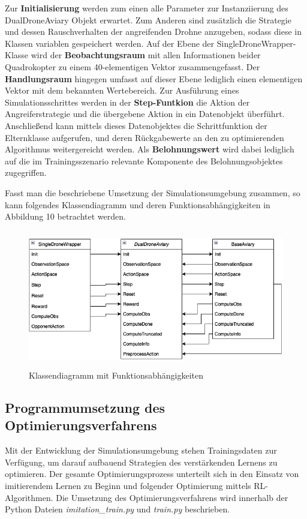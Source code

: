 Zur \textbf{Initialisierung} werden zum einen alle Parameter zur Instanziierung des DualDroneAviary Objekt erwartet.
Zum Anderen sind zusätzlich die Strategie und dessen Rauschverhalten der angreifenden Drohne anzugeben, sodass diese in Klassen variablen gespeichert werden.
Auf der Ebene der SingleDroneWrapper-Klasse wird der \textbf{Beobachtungsraum} mit allen Informationen beider Quadrokopter zu einem 40-elementigen Vektor zusammengefasst.
Der \textbf{Handlungsraum} hingegen umfasst auf dieser Ebene lediglich einen elementigen Vektor mit dem bekannten Wertebereich.
Zur Ausführung eines Simulationsschrittes werden in der \textbf{Step-Funtkion} die Aktion der Angreiferstrategie und die übergebene Aktion in ein Datenobjekt überführt.
Anschließend kann mittels dieses Datenobjektes die Schrittfunktion der Elternklasse aufgerufen, und deren Rückgabewerte an den zu optimierenden Algorithmus weitergereicht werden.
Als \textbf{Belohnungswert} wird dabei lediglich auf die im Trainingsszenario relevante Komponente des Belohnungsobjektes zugegriffen.

Fasst man die beschriebene Umsetzung der Simulationsumgebung zusammen, so kann folgendes Klassendiagramm und deren Funktionsabhängigkeiten in Abbildung 10 betrachtet werden.

\begin{figure}[htb]
    \centering
    \includegraphics[height=6cm]{lib/graphics/simenv structure.png}
    \caption[Klassendiagramm mit Funktionsabhängigkeiten]{Klassendiagramm mit Funktionsabhängigkeiten\footnotemark}
    \label{abb:drone axis}
\end{figure}

\subsection{Programmumsetzung des Optimierungsverfahrens}

Mit der Entwicklung der Simulationsumgebung stehen Trainingsdaten zur Verfügung, um darauf aufbauend Strategien des verstärkenden Lernens zu optimieren.
Der gesamte Optimierungsprozess unterteilt sich in den Einsatz von imitierendem Lernen zu Beginn und folgender Optimierung mittels RL-Algorithmen. 
Die Umsetzung des Optimierungsverfahrens wird innerhalb der Python Dateien \textit{imitation\_train.py} und \textit{train.py} beschrieben.

